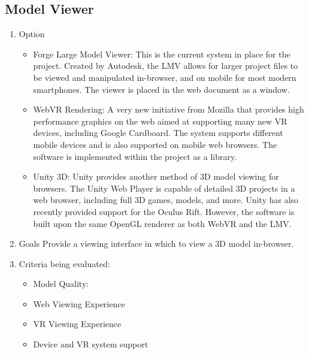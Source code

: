 \documentclass[letterpaper, 10pt, draftclsnofoot, compsoc, onecolumn]{IEEEtran}
\begin{document}
	\subsection{Model Viewer}
		\begin{enumerate}
			\item{Option}
				\begin{itemize}
					\item{Forge Large Model Viewer: This is the current system in place for the project. Created by Autodesk, the LMV allows for larger project files to be viewed and manipulated in-browser, and on mobile for most modern smartphones. The viewer is placed in the web document as a window.}
					\item{WebVR Rendering: A very new initiative from Mozilla that provides high performance graphics on the web aimed at supporting many new VR devices, including Google Cardboard. The system supports different mobile devices and is also supported on mobile web browsers. The software is implemented within the project as a library. }
					\item{Unity 3D: Unity provides another method of 3D model viewing for browsers. The Unity Web Player is capable of detailed 3D projects in a web browser, including full 3D games, models, and more. Unity has also recently provided support for the Oculus Rift. However, the software is built upon the same OpenGL renderer as both WebVR and the LMV. }
		
				\end{itemize}
			\item{Goals}
			Provide a viewing interface in which to view a 3D model in-browser.
			
			\item{Criteria being evaluated:}
			
			\begin{itemize}
					\item{Model Quality:}
					\item{Web Viewing Experience}
					\item{VR Viewing Experience}
					\item{Device and VR system support}
			\end{itemize}
			

\end{enumerate}
\end{document}

